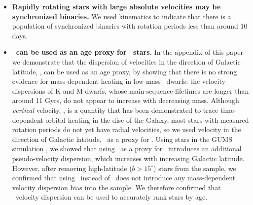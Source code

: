 \begin{itemize}
\item{{\bf Rapidly rotating stars with large absolute velocities may be
synchronized binaries.}
We used kinematics to indicate that there is a population of
synchronized binaries with rotation periods less than around 10 days.}

\item{{\bf \sigmavb\ can be used as an age proxy for \kepler\ stars.} In the
    appendix of this paper we demonstrate that the dispersion of velocities in
        the direction of Galactic latitude, \vb, can be used as an age proxy,
        by showing that there is no strong evidence for mass-dependent heating
        in low-mass \kepler\ dwarfs: the velocity dispersions of K and M
        dwarfs, whose main-sequence lifetimes are longer than around 11 Gyrs,
        do not appear to increase with decreasing mass.
Although {\it vertical} velocity, \vz, is a quantity that has been
demonstrated to trace time-dependent orbital heating in the disc of the
Galaxy, most stars with measured rotation periods do not yet have radial
velocities, so we used velocity in the direction of Galactic latitude, \vb\,
as a proxy for \vz.
        Using stars in the GUMS simulation \citep{robin2012}, we showed that
        using \vb\ as a proxy for \vz\ introduces an additional
        pseudo-velocity dispersion, which increases with increasing Galactic
        latitude.
However, after removing high-latitude ($b>15^\circ$) stars from the sample, we
confirmed that using \vb\ instead of \vz\ does not introduce any
mass-dependent velocity dispersion bias into the sample.
We therefore confirmed that \vb\ velocity dispersion can be used to accurately
rank stars by age.}

\end{itemize}


